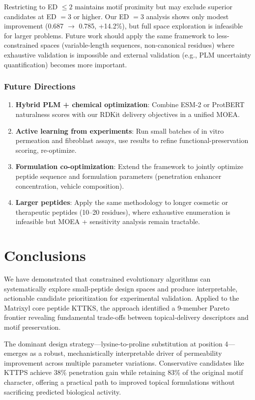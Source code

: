 \documentclass[11pt,a4paper]{article}
\begin{document}
Restricting to ED $\leq 2$ maintains motif proximity but may exclude superior candidates at ED $=3$ or higher. Our ED $=3$ analysis shows only modest improvement (0.687 $\to$ 0.785, +14.2\%), but full space exploration is infeasible for larger problems. Future work should apply the same framework to less-constrained spaces (variable-length sequences, non-canonical residues) where exhaustive validation is impossible and external validation (e.g., PLM uncertainty quantification) becomes more important.

\subsubsection{Future Directions}

\begin{enumerate}
  \item \textbf{Hybrid PLM + chemical optimization}: Combine ESM-2 or ProtBERT naturalness scores with our RDKit delivery objectives in a unified MOEA.
  \item \textbf{Active learning from experiments}: Run small batches of in vitro permeation and fibroblast assays, use results to refine functional-preservation scoring, re-optimize.
  \item \textbf{Formulation co-optimization}: Extend the framework to jointly optimize peptide sequence and formulation parameters (penetration enhancer concentration, vehicle composition).
  \item \textbf{Larger peptides}: Apply the same methodology to longer cosmetic or therapeutic peptides (10--20 residues), where exhaustive enumeration is infeasible but MOEA + sensitivity analysis remain tractable.
\end{enumerate}

\section{Conclusions}

We have demonstrated that constrained evolutionary algorithms can systematically explore small-peptide design spaces and produce interpretable, actionable candidate prioritization for experimental validation. Applied to the Matrixyl core peptide KTTKS, the approach identified a 9-member Pareto frontier revealing fundamental trade-offs between topical-delivery descriptors and motif preservation.

The dominant design strategy---lysine-to-proline substitution at position 4---emerges as a robust, mechanistically interpretable driver of permeability improvement across multiple parameter variations. Conservative candidates like KTTPS achieve 38\% penetration gain while retaining 83\% of the original motif character, offering a practical path to improved topical formulations without sacrificing predicted biological activity.
\end{document}
